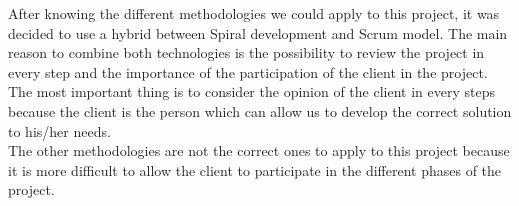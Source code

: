 After knowing the different methodologies we could apply to this project, it was decided to use a hybrid between Spiral development and Scrum model. The main reason to combine both technologies is the possibility to review the project in every step and the importance of the participation of the client in the project. The most important thing is to consider the opinion of the client in every steps because the client is the person which can allow us to develop the correct solution to his/her needs.\\

The other methodologies are not the correct ones to apply to this project because it is more difficult to allow the client to participate in the different phases of the project.

\newpage